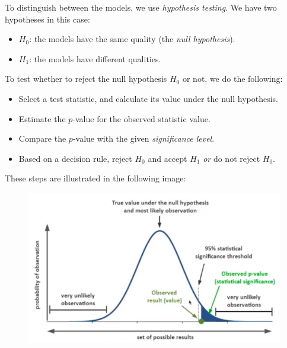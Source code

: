 To distinguish between the models, we use \textit{hypothesis testing}. We have two hypotheses in this case:
\begin{itemize}
\item $H_0$: the models have the same quality (the \textit{null hypothesis}).
\item $H_1$: the models have different qualities.
\end{itemize}
To test whether to reject the null hypothesis $H_0$ or not, we do the following:
\begin{itemize}
\item Select a test statistic, and calculate its value under the null hypothesis.
\item Estimate the $p$-value for the observed statistic value.
\item Compare the $p$-value with the given \textit{significance level}.
\item Based on a decision rule, reject $H_0$ and accept $H_1$ \textit{or} do not reject $H_0$.
\end{itemize}
These steps are illustrated in the following image:
\begin{figure}[H]
\centering
\includegraphics[scale=0.4]{hypothesistesting.png}
\end{figure}


